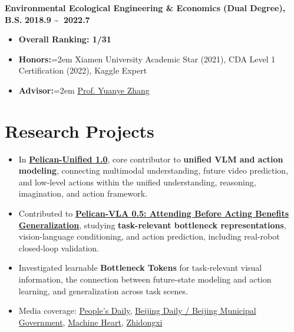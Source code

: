 \documentclass{resume}
\begin{document}
\begin{flushleft}
\textbf{Environmental Ecological Engineering \& Economics (Dual Degree), B.S.} \hfill \textbf{2018.9 \textasciitilde\ 2022.7}
\end{flushleft}
\begin{itemize}
    \item \textbf{Overall Ranking: 1/31}
    \item \textbf{Honors:}\hangindent=2em
    Xiamen University Academic Star (2021), CDA Level 1 Certification (2022), Kaggle Expert
    \item \textbf{Advisor:}\hangindent=2em
    \href{https://scholar.google.com/citations?user=l1GMXf4AAAAJ&hl=en&oi=ao}{Prof. Yuanye Zhang}
\end{itemize}
\section{\makebox[.75em][c]{\faFlask} \textbf{Research Projects}}
\begin{itemize}
    \item In \href{https://arxiv.org/abs/2605.15153}{\textbf{Pelican-Unified 1.0}}, core contributor to \textbf{unified VLM and action modeling}, connecting multimodal understanding, future video prediction, and low-level actions within the unified understanding, reasoning, imagination, and action framework.
    \item Contributed to \href{https://arxiv.org/abs/2607.06655}{\textbf{Pelican-VLA 0.5: Attending Before Acting Benefits Generalization}}, studying \textbf{task-relevant bottleneck representations}, vision-language conditioning, and action prediction, including real-robot closed-loop validation.
    \item Investigated learnable \textbf{Bottleneck Tokens} for task-relevant visual information, the connection between future-state modeling and action learning, and generalization across task scenes.
    \item Media coverage: \href{https://www.peopleapp.com/column/30052155186-500007497131}{People's Daily}, \href{https://www.beijing.gov.cn/fuwu/lqfw/gggs/202605/t20260519_4656998.html}{Beijing Daily / Beijing Municipal Government}, \href{https://mp.weixin.qq.com/s/z-OAqnl4IKHpaiT4bYBHIA}{Machine Heart}, \href{https://www.zhidx.com/p/558258.html}{Zhidongxi}
\end{itemize}
\end{document}
